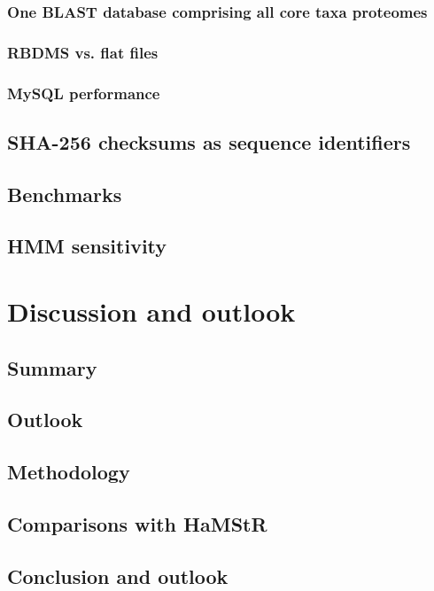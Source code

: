 \documentclass[a4paper,12.5pt]{scrreprt}
\newcommand{\hamstr}{HaMStR\xspace}
\begin{document}
		\subsection{One BLAST database comprising all core taxa proteomes}
			
		\subsection{RBDMS vs. flat files}
		\subsection{MySQL performance}
	\section{SHA-256 checksums as sequence identifiers}
		
	\section{Benchmarks}
	\section{HMM sensitivity}

\chapter{Discussion and outlook}
	
	\section{Summary}
	\section{Outlook}
\clearpage

\section{Methodology}
\clearpage

\section{Comparisons with \hamstr}
\clearpage

\section{Conclusion and outlook}
\clearpage
\end{document}
